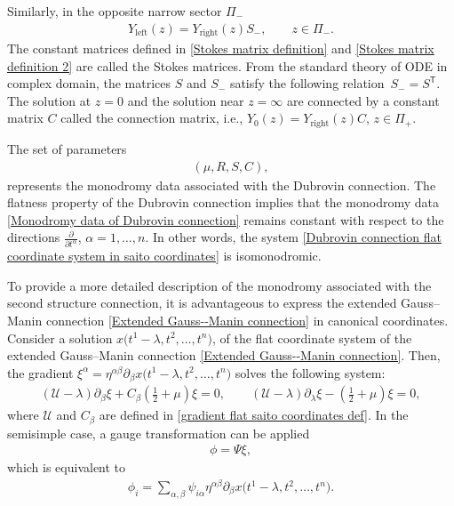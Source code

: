 \documentclass[pdftex]{sigma}
\numberwithin{equation}{section}
\begin{document}
Similarly, in the opposite narrow sector $\Pi_{-}$
\begin{gather}\label{Stokes matrix definition 2}
 Y_{\text{left}}(z) = Y_{\text{right}}(z)S_{-}, \qquad z \in \Pi_{-}.
\end{gather}
The constant matrices defined in \eqref{Stokes matrix definition} and \eqref{Stokes matrix definition 2} are called the Stokes matrices. From the standard theory of ODE in complex domain, the matrices $S$ and $S_{-}$ satisfy the following relation~${
S_{-}=S^{\mathsf T}}$.
The solution at \(z=0\) and the solution near \(z=\infty\) are connected by a constant matrix \(C\) called the connection matrix, i.e.,
$Y_{0}(z) = Y_{\text{right}}(z)C$, $ z \in \Pi_{+}$.

The set of parameters
\begin{gather}\label{Monodromy data of Dubrovin connection}
 (\mu, R, S, C),
\end{gather}
represents the monodromy data associated with the Dubrovin connection. The flatness property of the Dubrovin connection implies that the monodromy data \eqref{Monodromy data of Dubrovin connection} remains constant with respect to the directions $\frac{\partial}{\partial t^{\alpha}}$, $\alpha=1, \dots, n$. In other words, the system \eqref{Dubrovin connection flat coordinate system in saito coordinates} is isomonodromic.

To provide a more detailed description of the monodromy associated with the second structure connection, it is advantageous to express the extended Gauss--Manin connection \eqref{Extended Gauss--Manin connection} in canonical coordinates. Consider a solution
$
 x\bigl(t^1-\lambda, t^2, \dots, t^n\bigr)$,
of the flat coordinate system of the extended Gauss--Manin connection \eqref{Extended Gauss--Manin connection}. Then, the gradient
${
 \xi^{\alpha} = \eta^{\alpha\beta}\partial_{\beta}x\bigl(t^1-\lambda, t^2, \dots, t^n\bigr)}
$
solves the following system:
\begin{gather}
 (\mathcal{U}-\lambda)\partial_{\beta}\xi + C_{\beta}\left(\frac{1}{2}+\mu\right)\xi = 0,\qquad
 (\mathcal{U}-\lambda)\partial_{\lambda}\xi - \left(\frac{1}{2}+\mu\right)\xi = 0,\label{Extended Gauss manin in matrix form flat Saito}
\end{gather}
where $\mathcal{U}$ and $C_{\beta}$ are defined in \eqref{gradient flat saito coordinates def}.
In the semisimple case, a gauge transformation can be applied
\begin{gather}\label{gauge transform canonical coordinate}
 \phi = \Psi\xi,
\end{gather}
which is equivalent to
\begin{gather}\label{gauge transform canonical coordinate part 2}
 \phi_i = \sum_{\alpha,\beta}\psi_{i\alpha}\eta^{\alpha\beta}\partial_{\beta}x\bigl(t^1-\lambda,t^2,\dots,t^n\bigr).
\end{gather}
\end{document}
